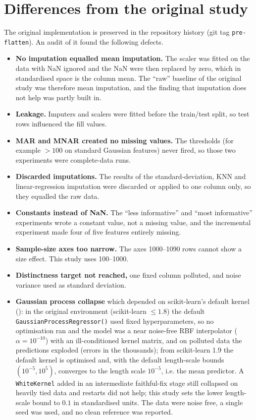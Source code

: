 \documentclass{Configuration_Files/PoliMi3i_thesis}
\begin{document}
\section{Differences from the original study}
\label{sec:differences}%
The original implementation is preserved in the repository history (git tag \texttt{pre-flatten}). An audit of it found the following defects.
\begin{itemize}
    \item \textbf{No imputation equalled mean imputation.} The scaler was fitted on the data with NaN ignored and the NaN were then replaced by zero, which in standardised space is the column mean. The ``raw'' baseline of the original study was therefore mean imputation, and the finding that imputation does not help was partly built in.
    \item \textbf{Leakage.} Imputers and scalers were fitted before the train/test split, so test rows influenced the fill values.
    \item \textbf{MAR and MNAR created no missing values.} The thresholds (for example $>100$ on standard Gaussian features) never fired, so those two experiments were complete-data runs.
    \item \textbf{Discarded imputations.} The results of the standard-deviation, KNN and linear-regression imputation were discarded or applied to one column only, so they equalled the raw data.
    \item \textbf{Constants instead of NaN.} The ``less informative'' and ``most informative'' experiments wrote a constant value, not a missing value, and the incremental experiment made four of five features entirely missing.
    \item \textbf{Sample-size axes too narrow.} The axes 1000--1090 rows cannot show a size effect. This study uses 100--1000.
    \item \textbf{Distinctness target not reached,} one fixed column polluted, and noise variance used as standard deviation.
    \item \textbf{Gaussian process collapse} which depended on scikit-learn's default kernel (): in the original environment (scikit-learn $\le 1.8$) the default \texttt{Gaussian\allowbreak Process\allowbreak Regressor()} used fixed hyperparameters, so no optimisation ran and the model was a near noise-free RBF interpolator ($\alpha=10^{-10}$) with an ill-conditioned kernel matrix, and on polluted data the predictions exploded (errors in the thousands); from scikit-learn 1.9 the default kernel is optimised and, with the default length-scale bounds $(10^{-5},10^{5})$, converges to the length scale $10^{-5}$, i.e. the mean predictor. A \texttt{WhiteKernel} added in an intermediate faithful-fix stage still collapsed on heavily tied data and restarts did not help; this study sets the lower length-scale bound to $0.1$ in standardised units. The data were noise free, a single seed was used, and no clean reference was reported.
\end{itemize}
\end{document}

